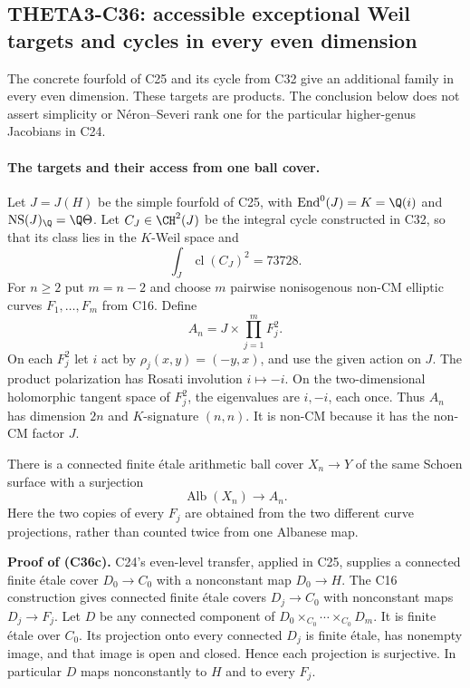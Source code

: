 \subsection{THETA3-C36: accessible exceptional Weil targets and cycles in every even dimension}\label{C36}

The concrete fourfold of C25 and its cycle from C32 give an
additional family in every even dimension. These targets are
products. The conclusion below does not assert simplicity or
N\'eron--Severi rank one for the particular higher-genus
Jacobians in C24.

\paragraph{The targets and their access from one ball cover.}
Let $J=J(H)$ be the simple fourfold of C25, with
$\operatorname{End}^0(J)=K=\Q(i)$ and
$\operatorname{NS}(J)_\Q=\Q\Theta$. Let
$C_J\in\CH^2(J)$ be the integral cycle constructed in
C32, so that its class lies in the $K$-Weil space and
\[
                 \int_J\operatorname{cl}(C_J)^2=73728.
 \tag{C36a}
\]
For $n\ge2$ put $m=n-2$ and choose $m$ pairwise
nonisogenous non-CM elliptic curves $F_1,\ldots,F_m$
from C16. Define
\[
                  A_n=J\times\prod_{j=1}^m F_j^2.
 \tag{C36b}
\]
On each $F_j^2$ let $i$ act by
$\rho_j(x,y)=(-y,x)$, and use the given action on $J$.
The product polarization has Rosati involution
$i\mapsto-i$. On the two-dimensional holomorphic tangent
space of $F_j^2$, the eigenvalues are $i,-i$, each once.
Thus $A_n$ has dimension $2n$ and $K$-signature $(n,n)$.
It is non-CM because it has the non-CM factor $J$.

There is a connected finite \'etale arithmetic ball cover
$X_n\to Y$ of the same Schoen surface with a surjection
\[
                    \operatorname{Alb}(X_n)
                               \longrightarrow A_n.
 \tag{C36c}
\]
Here the two copies of every $F_j$ are obtained from the
two different curve projections, rather than counted
twice from one Albanese map.

\textbf{Proof of (C36c).}
C24's even-level transfer, applied in C25, supplies a
connected finite \'etale cover $D_0\to C_0$ with a
nonconstant map $D_0\to H$. The C16 construction gives
connected finite \'etale covers $D_j\to C_0$ with
nonconstant maps $D_j\to F_j$. Let $D$ be any connected
component of
$D_0\times_{C_0}\cdots\times_{C_0}D_m$.
It is finite \'etale over $C_0$. Its projection onto every
connected $D_j$ is finite \'etale, has nonempty image,
and that image is open and closed. Hence each projection
is surjective. In particular $D$ maps nonconstantly to
$H$ and to every $F_j$.

